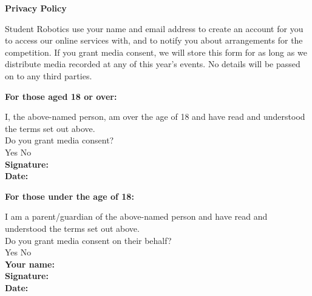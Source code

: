 \documentclass[a4paper,10pt]{article}
\newcommand{\checkbox}[1]{#1\hspace{0.2cm}\raisebox{-0.3mm}{$\square$}}
\newcommand{\textfield}[1]{\textbf{#1:} \hrulefill\hspace{0mm}}
\newcommand{\fieldsep}{\\[2.5mm]}
\begin{document}
\textbf{\large Privacy Policy}\\\vspace{-3mm}

Student Robotics use your name and email address to create an account for you to access our online services with, and to notify you about arrangements for the competition.
If you grant media consent, we will store this form for as long as we distribute media recorded at any of this year's events.
No details will be passed on to any third parties. \\

\begin{minipage}[t]{0.48\textwidth}
\textbf{For those aged 18 or over:}

I, the above-named person, am over the age of 18 and have read and understood the terms set out above.\\

Do you grant media consent? \\[2mm]
\checkbox{Yes} \hspace{1cm} \checkbox{No}\\

\textfield{Signature} \fieldsep
\textfield{Date}
\end{minipage}
\hspace{0.02\textwidth}
\begin{minipage}[t]{0.48\textwidth}
\textbf{For those under the age of 18:}

I am a parent/guardian of the above-named person and have read and understood the terms set out above.\\

Do you grant media consent on their behalf?\\[2mm]
\checkbox{Yes} \hspace{1cm} \checkbox{No}\\

\textfield{Your name} \fieldsep
\textfield{Signature} \fieldsep
\textfield{Date}
\end{minipage}
\end{document}
